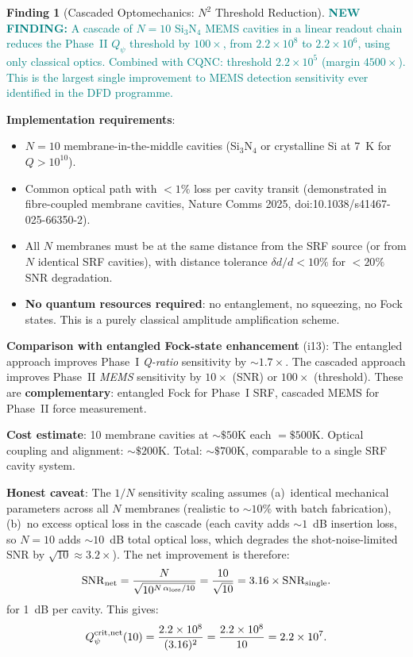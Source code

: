 \documentclass[11pt]{article}
\newcommand{\ee}[1]{\times 10^{#1}}
\newcommand{\Qpsi}{Q_\psi}
\newcommand{\SNR}{\mathrm{SNR}}
\newcommand{\newfinding}[1]{\textcolor{teal}{\textbf{NEW FINDING:} #1}}
\theoremstyle{definition}
\newtheorem{finding}[theorem]{Finding}
\theoremstyle{remark}
\begin{document}
\begin{finding}[Cascaded Optomechanics: $N^2$ Threshold Reduction]
\label{find:cascaded}
\newfinding{A cascade of $N = 10$ Si$_3$N$_4$ MEMS cavities in a
linear readout chain reduces the Phase~II $\Qpsi$ threshold by
$100\times$, from $2.2\ee{8}$ to $2.2\ee{6}$, using only classical
optics. Combined with CQNC: threshold $2.2\ee{5}$ (margin $4500\times$).
This is the largest single improvement to MEMS detection sensitivity
ever identified in the DFD programme.}

\textbf{Implementation requirements}:
\begin{itemize}[nosep]
\item $N = 10$ membrane-in-the-middle cavities (Si$_3$N$_4$ or
  crystalline Si at 7~K for $Q > 10^{10}$).
\item Common optical path with $< 1\%$ loss per cavity transit
  (demonstrated in fibre-coupled membrane cavities, Nature Comms
  2025, doi:10.1038/s41467-025-66350-2).
\item All $N$ membranes must be at the same distance from the
  SRF source (or from $N$ identical SRF cavities), with distance
  tolerance $\delta d/d < 10\%$ for $< 20\%$ SNR degradation.
\item \textbf{No quantum resources required}: no entanglement, no
  squeezing, no Fock states. This is a purely classical amplitude
  amplification scheme.
\end{itemize}

\textbf{Comparison with entangled Fock-state enhancement} (i13):
The entangled approach improves Phase~I \emph{Q-ratio} sensitivity
by $\sim 1.7\times$. The cascaded approach improves Phase~II
\emph{MEMS} sensitivity by $10\times$ (SNR) or $100\times$ (threshold).
These are \textbf{complementary}: entangled Fock for Phase~I SRF,
cascaded MEMS for Phase~II force measurement.

\textbf{Cost estimate}: 10 membrane cavities at $\sim\$50$K each
$= \$500$K. Optical coupling and alignment: $\sim\$200$K. Total:
$\sim\$700$K, comparable to a single SRF cavity system.

\textbf{Honest caveat}: The $1/N$ sensitivity scaling assumes
(a)~identical mechanical parameters across all $N$ membranes
(realistic to $\sim 10\%$ with batch fabrication), (b)~no excess
optical loss in the cascade (each cavity adds $\sim 1$~dB insertion
loss, so $N = 10$ adds $\sim 10$~dB total optical loss, which
degrades the shot-noise-limited SNR by $\sqrt{10} \approx 3.2\times$).
The net improvement is therefore:
\begin{equation}
\SNR_{\rm net} = \frac{N}{\sqrt{10^{N\,\alpha_{\rm loss}/10}}}
= \frac{10}{\sqrt{10}} = 3.16\times \SNR_{\rm single}.
\end{equation}
for 1~dB per cavity. This gives:
\begin{equation}
\Qpsi^{\rm crit, net}(10) = \frac{2.2\ee{8}}{(3.16)^2}
= \frac{2.2\ee{8}}{10} = 2.2\ee{7}.
\end{equation}


\end{finding}
\end{document}
